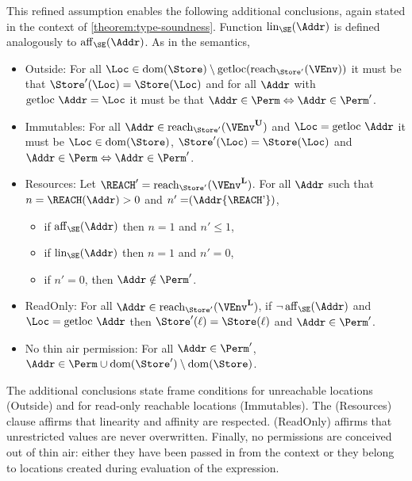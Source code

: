 This refined assumption enables the following additional conclusions,
again stated in the context of \cref{theorem:type-soundness}. Function
$\Linear{\SE}\Addr$ is defined analogously to  $\Affine{\SE}\Addr$.  As
in the semantics, 
\begin{itemize}
\item Outside:
  For all $\Loc \in \Dom{\Store} \setminus \text{getloc} (\Reach{\Store'}{\VEnv})$ it must be that 
  $\Store' (\Loc) = \Store (\Loc)$
  and for all $\Addr$ with $\text{getloc }\Addr=\Loc$ it must be that
  $\Addr\in\Perm \Leftrightarrow \Addr\in\Perm'$. 
\item Immutables: For all $\Addr \in
  \Reach{\Store'}{\ImmutableBorrows\VEnv}$ 
  and $\Loc = \text{getloc }\Addr$
  it must be 
  $\Loc\in\Dom\Store$, 
  $\Store' (\Loc) = \Store (\Loc)$
  and $\Addr\in\Perm \Leftrightarrow \Addr\in\Perm'$.
\item Resources:
  Let $\REACH' =\Reach{\Store'}{\Active\VEnv}$.
  For all $\Addr$ such that $n= \MultiNumber\Addr\REACH >0$ and $n' =
  \MultiNumber\Addr{\REACH'}$, 
  \begin{itemize}
  \item if $\Affine{\SE}\Addr$ then $n=1$ and $n'\le 1$,
  \item if $\Linear{\SE}\Addr$ then $n=1$ and $n' = 0$,
  \item if $n'=0$, then $\Addr\notin\Perm'$.
  \end{itemize}
\item ReadOnly: For all $\Addr \in \Reach
  {\Store'}{\Active\VEnv}$, if $\neg\Writeable{\SE}\Addr$
  and $\Loc = \text{getloc }\Addr$
  then
  $\Store' (\ell) = \Store (\ell)$ and $\Addr\in \Perm'$.
\item No thin air permission: For all $\Addr\in \Perm'$, $\Addr
  \in \Perm \cup  \Dom{\Store'} \setminus \Dom{\Store}$.
\end{itemize}
The additional conclusions state frame conditions for unreachable
locations (Outside) and for read-only reachable locations
(Immutables). The (Resources) clause affirms that linearity and
affinity are respected. (ReadOnly) affirms that unrestricted values
are never overwritten. Finally, no permissions are conceived out of
thin air: either they have been passed in from the context or they
belong to locations created during evaluation of the expression.

\lstDeleteShortInline@


